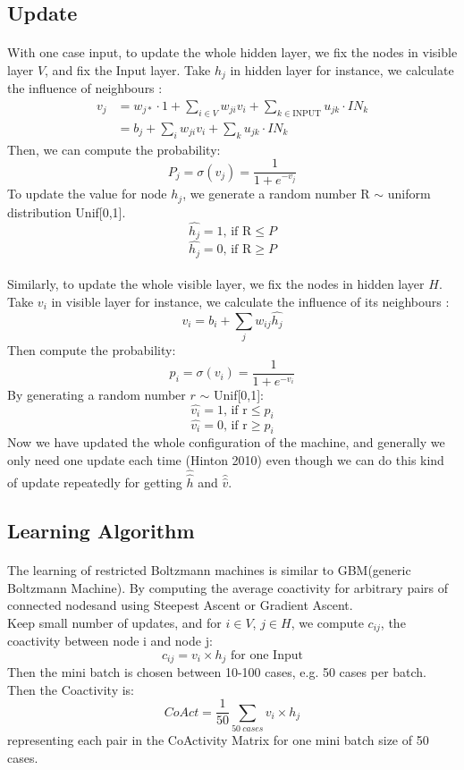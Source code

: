 \documentclass{article}
\begin{document}
\subsection{Update}
\paragraph{}
With one case input, to update the whole hidden layer, we fix the nodes in visible layer $V$, and fix the Input layer. Take $h_j$ in hidden layer for instance, we calculate the influence of neighbours :
\begin{align*}
v_j&=w_{j*}\cdot1+\sum\limits_{i\in V}w_{ji}v_i+\sum_{k\in \text{INPUT}}u_{jk}\cdot IN_k\\
&=b_j+\sum\limits_{i}w_{ji}v_i+\sum_{k}u_{jk}\cdot IN_k
\end{align*}
Then, we can compute the probability:
\[P_j=\sigma(v_j)=\frac1 {1+e^{-v_j}}\]
To update the value for node $h_j$, we generate a random number R $\sim$ uniform distribution Unif[0,1]. \\
\[\hat{h_j}=1\text{, if R}\leq P\]
\[\hat{h_j}=0\text{, if R}\geq P\]
\paragraph{}
Similarly, to update the whole visible layer, we fix the nodes in hidden layer $H$.\\
Take $v_i$ in visible layer for instance, we calculate the influence of its neighbours :
\[v_i=b_i+\sum_j w_{ij}\hat {h_j}\]
Then compute the probability:
\[p_i=\sigma(v_i)=\frac1{1+e^{-v_i}}\]
By generating a random number $r$ $\sim$ Unif[0,1]:
\[\hat{v_i}=1\text{, if r}\leq p_i\]
\[\hat{v_i}=0\text{, if r}\geq p_i\]
Now we have updated the whole configuration of the machine, and generally we only need one update each time (Hinton 2010) even though we can do this kind of update repeatedly for getting $\hat{\hat{h}}$ and $\hat{\hat{v}}$.
\subsection{Learning Algorithm}
\paragraph{}
The learning of restricted Boltzmann machines is similar to GBM(generic Boltzmann Machine). By computing the average coactivity for arbitrary pairs of connected nodesand using Steepest Ascent or Gradient Ascent.\\
Keep small number of updates, and for $i\in V$, $j\in H$, we compute $c_{ij}$, the coactivity between node i and node j:
\[c_{ij}=v_i\times h_j\text{ for one Input}\]
Then the mini batch is chosen between 10-100 cases, e.g. 50 cases per batch.\\
Then the Coactivity is:
\[CoAct=\frac1{50}\sum_{50\ cases}v_i\times h_j\]
representing each pair in the CoActivity Matrix for one mini batch size of 50 cases.
\end{document}
